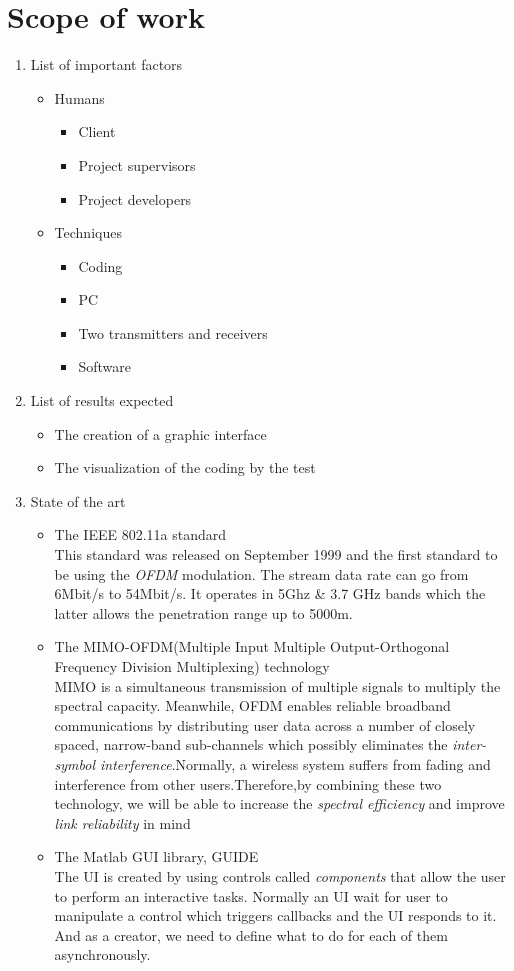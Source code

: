 \documentclass[12pt,a4paper]{article}
\begin{document}
\section{Scope of work}
\begin{enumerate}
\item List of important factors
\begin{itemize}
\item Humans
\begin{itemize}
\item Client
\item Project supervisors
\item Project developers
\end{itemize}
\item Techniques
\begin{itemize}
\item Coding
\item PC
\item Two transmitters and receivers
\item Software
\end{itemize}
\end{itemize}
\item List of results expected
\begin{itemize}
\item The creation of a graphic interface
\item The visualization of the coding by the test
\end{itemize}
\item State of the art
\begin{itemize}
\item The IEEE 802.11a standard\\
This standard was released on September 1999 and the first standard to be using the \textsl{OFDM} modulation. The stream data rate can go from 6Mbit/s to 54Mbit/s. It operates in 5Ghz \& 3.7 GHz bands which the latter allows the penetration range up to 5000m. 
\item The MIMO-OFDM(Multiple Input Multiple Output-Orthogonal Frequency Division Multiplexing) technology\\
MIMO is a simultaneous transmission of multiple signals to multiply the spectral capacity. Meanwhile, OFDM enables reliable broadband communications by distributing user data across a number of closely spaced, narrow-band sub-channels which possibly eliminates the \textsl{inter-symbol interference}.Normally, a wireless system suffers from fading and interference from other users.Therefore,by combining these two technology, we will be able to increase the \textsl{spectral efficiency }and improve \textsl{link reliability} in mind
\item The Matlab GUI library, GUIDE\\
The UI is created by using controls called \textsl{components} that allow the user to perform an interactive tasks. Normally an UI wait for user to manipulate a control which triggers callbacks and the UI responds to it. And as a creator, we need to define what to do for each of them asynchronously.
\end{itemize}
\end{enumerate}
\end{document}
